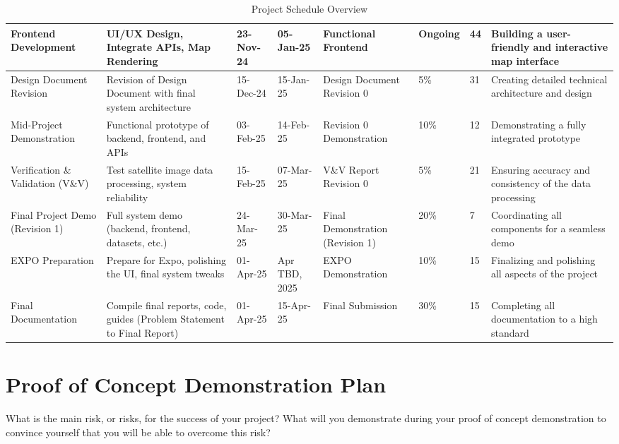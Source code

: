 \documentclass{article}
\begin{document}
\begin{table}[h!]
\begin{adjustbox}{max width=\textwidth}
\begin{tabular}{|p{3cm}|p{5cm}|p{2.5cm}|p{2.5cm}|p{4cm}|p{2cm}|p{2.5cm}|p{4cm}|}
  Frontend Development & UI/UX Design, Integrate APIs, Map Rendering & 23-Nov-24 & 05-Jan-25 & Functional Frontend & Ongoing & 44 & Building a user-friendly and interactive map interface \\ \hline
  Design Document Revision & Revision of Design Document with final system architecture & 15-Dec-24 & 15-Jan-25 & Design Document Revision 0 & 5\% & 31 & Creating detailed technical architecture and design \\ \hline
  Mid-Project Demonstration & Functional prototype of backend, frontend, and APIs & 03-Feb-25 & 14-Feb-25 & Revision 0 Demonstration & 10\% & 12 & Demonstrating a fully integrated prototype \\ \hline
  Verification \& Validation (V\&V) & Test satellite image data processing, system reliability & 15-Feb-25 & 07-Mar-25 & V\&V Report Revision 0 & 5\% & 21 & Ensuring accuracy and consistency of the data processing \\ \hline
  Final Project Demo (Revision 1) & Full system demo (backend, frontend, datasets, etc.) & 24-Mar-25 & 30-Mar-25 & Final Demonstration (Revision 1) & 20\% & 7 & Coordinating all components for a seamless demo \\ \hline
  EXPO Preparation & Prepare for Expo, polishing the UI, final system tweaks & 01-Apr-25 & Apr TBD, 2025 & EXPO Demonstration & 10\% & 15 & Finalizing and polishing all aspects of the project \\ \hline
  Final Documentation & Compile final reports, code, guides (Problem Statement to Final Report) & 01-Apr-25 & 15-Apr-25 & Final Submission & 30\% & 15 & Completing all documentation to a high standard \\ \hline
  \end{tabular}
  \end{adjustbox}
  \caption{Project Schedule Overview}
  \end{table}


\section{Proof of Concept Demonstration Plan}

What is the main risk, or risks, for the success of your project?  What will you
demonstrate during your proof of concept demonstration to convince yourself that
you will be able to overcome this risk?\\
\end{document}
